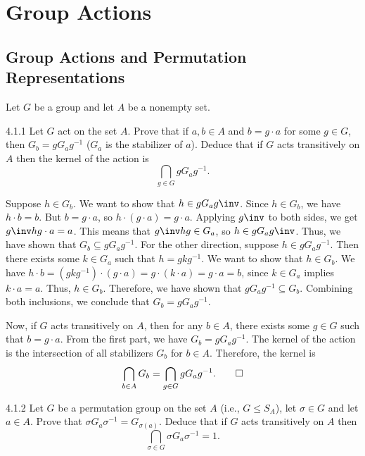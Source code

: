 \section{Group Actions}

\subsection{Group Actions and Permutation Representations}

Let $G$ be a group and let $A$ be a nonempty set.

\begin{exercise}{4.1.1}
	Let $G$ act on the set $A$.
	Prove that if $a,b \in A$ and $b = g \cdot a$ for some $g \in G$, then \(G_b = g G_a g^{-1}\) (\(G_a\) is the stabilizer of $a$).
	Deduce that if $G$ acts transitively on $A$ then the kernel of the action is
	\[
		\bigcap_{g \in G} g G_a g^{-1}.
	\]
\end{exercise}

\begin{sol}
	Suppose $h \in G_b$.
	We want to show that $h \in gG_ag\inv$.
	Since $h \in G_b$, we have $h \cdot b = b$.
	But $b = g \cdot a$, so $h \cdot (g \cdot a) = g \cdot a$.
	Applying $g\inv$ to both sides, we get $g\inv h g \cdot a = a$.
	This means that $g\inv h g \in G_a$, so $h \in g G_a g\inv$.
	Thus, we have shown that \(G_b \subseteq g G_a g^{-1}\).
	For the other direction, suppose $h \in g G_a g^{-1}$.
	Then there exists some $k \in G_a$ such that $h = g k g^{-1}$.
	We want to show that $h \in G_b$.
	We have $h \cdot b = (g k g^{-1}) \cdot (g \cdot a) = g \cdot (k \cdot a) = g \cdot a = b$, since $k \in G_a$ implies $k \cdot a = a$.
	Thus, $h \in G_b$.
	Therefore, we have shown that \(g G_a g^{-1} \subseteq G_b\).
	Combining both inclusions, we conclude that \(G_b = g G_a g^{-1}\).

	Now, if $G$ acts transitively on $A$, then for any $b \in A$, there exists some $g \in G$ such that $b = g \cdot a$.
	From the first part, we have \(G_b = g G_a g^{-1}\).
	The kernel of the action is the intersection of all stabilizers \(G_b\) for \(b \in A\).
	Therefore, the kernel is
	\[
		\bigcap_{b \in A} G_b = \bigcap_{g \in G} g G_a g^{-1}. \qedhere
	\]
\end{sol}

\begin{exercise}{4.1.2}
	Let $G$ be a permutation group on the set $A$ (i.e., \(G \leq S_A\)), let \(\sigma \in G\) and let \(a \in A\).
	Prove that \(\sigma G_a \sigma^{-1} = G_{\sigma(a)}\).
	Deduce that if $G$ acts transitively on $A$ then 
	\[
		\bigcap_{\sigma \in G} \sigma G_a \sigma^{-1} = 1.
	\]
\end{exercise}

